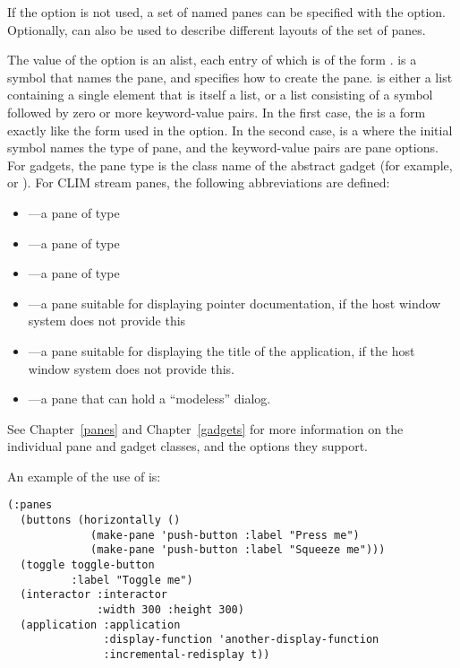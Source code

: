 If the  option is not used, a set of named panes can be specified with
the  option.  Optionally,  can also be used to describe
different layouts of the set of panes.

The value of the  option is an alist, each entry of which is of the
form .   is a symbol that names the pane, and
 specifies how to create the pane.   is either a list
containing a single element that is itself a list, or a list consisting of a
symbol followed by zero or more keyword-value pairs.  In the first case, the
 is a form exactly like the form used in the  option.  In
the second case,  is a  where the initial
symbol names the type of pane, and the keyword-value pairs are pane options.
For gadgets, the pane type is the class name of the abstract gadget (for
example,  or ).  For CLIM stream panes, the following
abbreviations are defined:

\begin{itemize}
\item {}---a pane of type 

\item {}---a pane of type 

\item {}---a pane of type 

\item {}---a pane suitable for displaying pointer
documentation, if the host window system does not provide this

\item {}---a pane suitable for displaying the title of the application,
if the host window system does not provide this.

\item {}---a pane that can hold a ``modeless''
 dialog.
\end{itemize}

See Chapter~\ref{panes} and Chapter~\ref{gadgets} for more information on the
individual pane and gadget classes, and the options they support.

An example of the use of  is:

\begin{verbatim}
(:panes
  (buttons (horizontally ()
             (make-pane 'push-button :label "Press me")
             (make-pane 'push-button :label "Squeeze me")))
  (toggle toggle-button 
          :label "Toggle me")
  (interactor :interactor
              :width 300 :height 300)
  (application :application
               :display-function 'another-display-function
               :incremental-redisplay t))
\end{verbatim}

